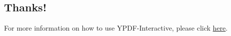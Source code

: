 \documentclass[10pt,letterpaper,twocolumn,landscape]{article}
\newenvironment{cframed}{\begin{mdframed}[linecolor=logoPeach,linewidth=0.4mm]}{\end{mdframed}}
\newcommand{\YPDFI}{{\fontfamily{fvs}\selectfont YPDF-Interactive}}
\begin{document}
\begin{cframed}
\begin{tabular}{l c l l p{4cm}}



\end{tabular}

\end{cframed}

\subsection*{Thanks!}
For more information on how to use \YPDFI{}, please click 
\href{http://mmui-lts-dev.193b.starter-ca-central-1.openshiftapps.com/}{here}.
\end{document}
